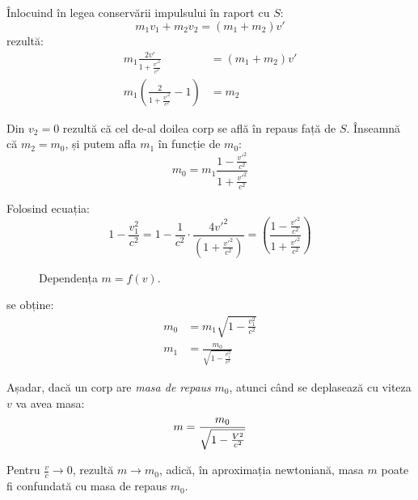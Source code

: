 Înlocuind în legea conservării impulsului în raport cu $S$:
\[ m_1 v_1 + m_2 v_2 = (m_1 + m_2) v' \]
rezultă:
\[
    \begin{aligned}
        m_1 \frac{2v'}{1 + \frac{v'^2}{c^2}} &= \left( m_1 + m_2 \right)v' \\
        m_1 \left( \frac{2}{1 + \frac{v'^2}{c^2}} - 1 \right) &= m_2
    \end{aligned}
\]

Din \( v_2 = 0 \) rezultă că cel de-al doilea corp se află în repaus față de $S$.
Înseamnă că \( m_2 = m_0 \), și putem afla $m_1$ în funcție de $m_0$:
\[ m_0 = m_1 \frac{1 - \frac{v'^2}{c^2}}{1 + \frac{v'^2}{c^2}} \]

Folosind ecuația:
\[
    1 - \frac{v_1^2}{c^2}
    = 1 - \frac{1}{c^2}\cdot\frac{4v'^2}{\left(1 + \frac{v'^2}{c^2}\right)}
    = \left(\frac{1 - \frac{v'^2}{c^2}}{1 + \frac{v'^2}{c^2}}\right)
\]

\begin{wrapfigure}{r}{0pt}
    \caption{Dependența $m = f(v)$.}
\end{wrapfigure}

se obține:
\[
    \begin{aligned}
        m_0 &= m_1\sqrt{1 - \frac{v_1^2}{c^2}} \\
        m_1 &= \frac{m_0}{\sqrt{1 - \frac{v_1^2}{c^2}}}
    \end{aligned}
\]

Așadar, dacă un corp are \emph{masa de repaus} $m_0$, atunci când se deplasează cu
viteza $v$ va avea masa:
{
    \color{\accentcolor}
    \[ m = \frac{m_0}{\sqrt{1 - \frac{V^2}{c^2}}} \]
}

Pentru \( \frac{v}{c} \rightarrow 0 \), rezultă \( m \rightarrow m_0 \), adică, în
aproximația newtoniană, masa $m$ poate fi confundată cu masa de repaus $m_0$.

